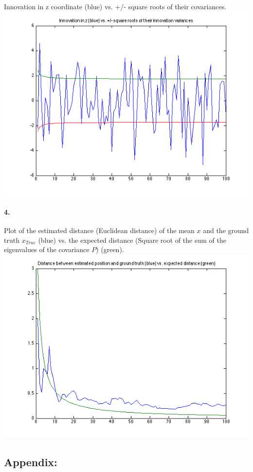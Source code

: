 \documentclass[a4paper]{article}
\begin{document}
Innovation in z coordinate (blue) vs. +/- square roots of their covariances.\\
\includegraphics[scale=.75]{innovation_in_z.png}

\paragraph{4. } Plot of the estimated distance (Euclidean distance) of the mean $x$ and the ground truth $x_{True}$ (blue) vs. the expected distance (Square root of the sum of the eigenvalues of the covariance $P$) (green).\\
\includegraphics[scale=.75]{estimated_position.png}

\newpage
\subsection*{Appendix:}

\end{document}
